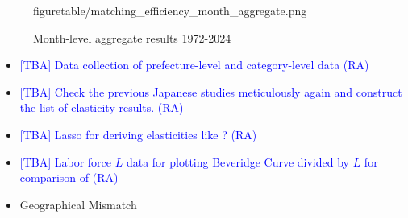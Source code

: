 \documentclass[12pt]{article}
\begin{document}
\begin{figure}[!ht]
\begin{center}
{  {figuretable/matching_efficiency_month_aggregate.png}}
  \\
  \caption{Month-level aggregate results 1972-2024}
  \label{fg:month_part_and_full_time_matching_efficiency_prefecture_results} 
  \end{center}
  \footnotesize
\end{figure} 


\begin{itemize}
    \item \textcolor{blue}{[TBA] Data collection of prefecture-level and category-level data (RA)}
    \item \textcolor{blue}{[TBA] Check the previous Japanese studies meticulously again and construct the list of elasticity results. (RA)}
    \item \textcolor{blue}{[TBA] Lasso for deriving elasticities like \cite{lange2020beyond}? (RA)}
    \item \textcolor{blue}{[TBA] Labor force $L$ data for plotting Beveridge Curve divided by $L$ for comparison of \cite{elsby2015beveridge} (RA)}
    \item Geographical Mismatch
\end{itemize}
\end{document}
